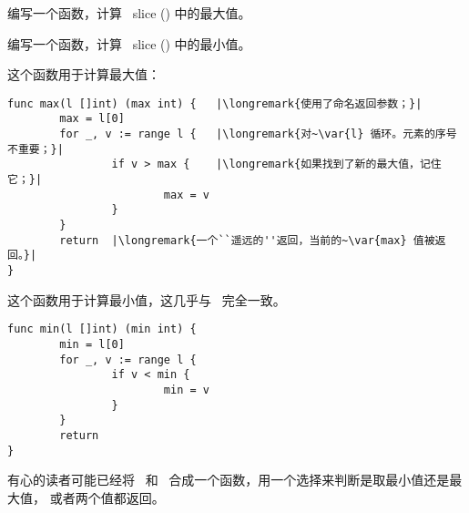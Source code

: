 \begin{Exercise}[title={最小值和最大值},difficulty=3]
\label{ex:minmax}
\Question\label{ex:minmax q1} 编写一个函数，计算~ slice () 中的最大值。

\Question\label{ex:minmax q2} 编写一个函数，计算~ slice () 中的最小值。

\end{Exercise}

\begin{Answer}
\Question 这个函数用于计算最大值：
\begin{lstlisting}
func max(l []int) (max int) {   |\longremark{使用了命名返回参数；}|
        max = l[0]      
        for _, v := range l {   |\longremark{对~\var{l} 循环。元素的序号不重要；}|
                if v > max {    |\longremark{如果找到了新的最大值，记住它；}|
                        max = v 
                }   
        }   
        return  |\longremark{一个``遥远的''返回，当前的~\var{max} 值被返回。}|
}
\end{lstlisting}
\showremarks

\Question 这个函数用于计算最小值，这几乎与~ 完全一致。
\begin{lstlisting}
func min(l []int) (min int) {
        min = l[0]
        for _, v := range l { 
                if v < min {
                        min = v 
                }   
        }   
        return
}
\end{lstlisting}
有心的读者可能已经将~ 和~ 合成一个函数，用一个选择来判断是取最小值还是最大值，
或者两个值都返回。
\end{Answer}
